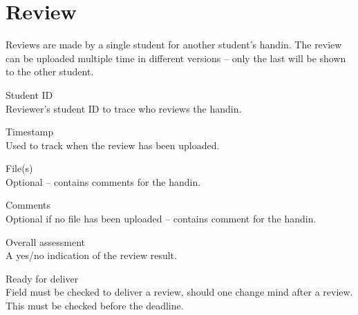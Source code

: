 \documentclass[Main]{subfiles}
\begin{document}
\newpage

\section{Review}
Reviews are made by a single student for another student's handin. 
The review can be uploaded multiple time in different versions -- only the last will be shown to the other student.

\begin{DataIntro}
\rExample{}
\end{DataIntro}

\begin{DataTable}


\Record
{Student ID\\Reviewer's student ID to trace who reviews the handin.}
{}
{}


\Record
{Timestamp\\Used to track when the review has been uploaded.}
{}
{}


\Record
{File(s)\\
Optional -- contains comments for the handin.}
{}
{}


\Record
{Comments\\
Optional if no file has been uploaded -- contains comment for the handin.}
{}
{}

\Record
{Overall assessment\\A yes/no indication of the review result.}
{}
{}

\Record
{Ready for deliver\\
Field must be checked to deliver a review, should one change mind after a review.
This must be checked before the deadline. }
{}
{}
\end{DataTable}





%
%
%
%
%
%
%
\end{document}
